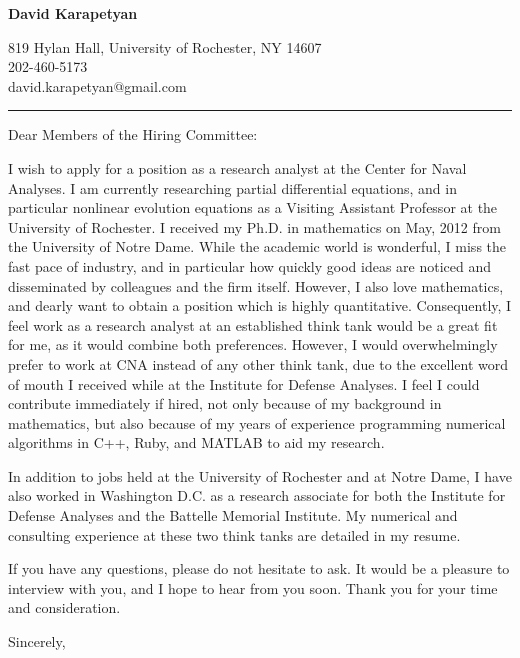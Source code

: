 \documentclass[12pt]{letter}
\date{\vspace{0.5cm}\flushleft}
\begin{document}
\begin{letter}{}
\begin{center}
{\bf {\Large David Karapetyan}}
\end{center}

\begin{center}
{819 Hylan Hall, University of Rochester, NY 14607  \\ 
202-460-5173 \\  david.karapetyan@gmail.com
}
\end{center}
\hrule

\opening{Dear Members of the Hiring Committee:\\}
%

%
I wish to apply for a position as a research analyst at the Center for Naval Analyses. I am currently researching partial differential equations, and in particular nonlinear
evolution equations as a Visiting Assistant Professor at the University of
Rochester. I received my Ph.D. in mathematics on May, 2012 from the University
of Notre Dame. While the academic world is wonderful, I miss the fast pace of
industry, and in particular how quickly good ideas are noticed and disseminated by colleagues and the firm itself. However, I also love mathematics, and dearly want to obtain
a position which is highly quantitative. Consequently, I feel work as a
research analyst at an established think tank would be a great fit for
me, as it would combine both preferences. However, I would overwhelmingly
prefer to work at CNA instead of any other think tank, due to the 
excellent word of mouth I received while at the Institute for Defense Analyses. I feel I could contribute immediately if hired, not only because of
my background in mathematics, but also because of my years of experience
programming numerical algorithms in C++, Ruby, and MATLAB to aid my research.

In addition to jobs held at the University of Rochester and at Notre Dame, I have
also worked in Washington D.C. as a research associate for both the Institute
for Defense Analyses and the Battelle Memorial Institute. My numerical and
consulting experience at these two think tanks are detailed in my resume. 

If you have any questions, please do not hesitate to ask. It would be a
pleasure to interview with you, and I hope to hear from you soon. Thank you for
your time and consideration. 

\closing{Sincerely,}


\end{letter}
\end{document}
